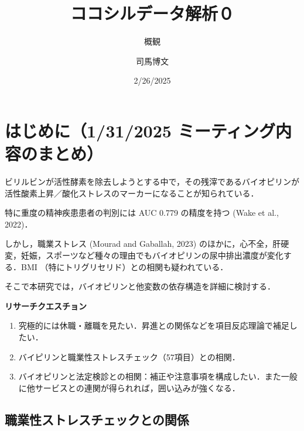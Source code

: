 \documentclass[
]{ltjsarticle}
\title{ココシルデータ解析０}
\subtitle{概観}
\author{司馬博文}
\date{2/26/2025}
\providecommand{\tightlist}{%
  \setlength{\itemsep}{0pt}\setlength{\parskip}{0pt}}\usepackage{longtable,booktabs,array}
\begin{document}
\maketitle


\section{はじめに（1/31/2025
ミーティング内容のまとめ）}\label{ux306fux3058ux3081ux306b1312025-ux30dfux30fcux30c6ux30a3ux30f3ux30b0ux5185ux5bb9ux306eux307eux3068ux3081}

ビリルビンが活性酵素を除去しようとする中で，その残滓であるバイオピリンが活性酸素上昇／酸化ストレスのマーカーになることが知られている．

特に重度の精神疾患患者の判別には AUC 0.779 の精度を持つ (Wake et al.,
2022)．

しかし，職業ストレス (Mourad and Gaballah, 2023)
のほかに，心不全，肝硬変，妊娠，スポーツなど種々の理由でもバイオピリンの尿中排出濃度が変化する．BMI
（特にトリグリセリド）との相関も疑われている．

そこで本研究では，バイオピリンと他変数の依存構造を詳細に検討する．

\begin{tcolorbox}[enhanced jigsaw, leftrule=.75mm, toprule=.15mm, bottomrule=.15mm, breakable, left=2mm, rightrule=.15mm, arc=.35mm, opacityback=0, colback=white, colframe=quarto-callout-tip-color-frame]

\vspace{-3mm}\textbf{リサーチクエスチョン}\vspace{3mm}

\begin{enumerate}
\def\labelenumi{\arabic{enumi}.}
\tightlist
\item
  {究極的には休職・離職を見たい}．昇進との関係などを項目反応理論で補足したい．
\item
  バイピリンと職業性ストレスチェック（57項目）との相関．
\item
  バイオピリンと法定検診との相関：補正や注意事項を構成したい．また一般に他サービスとの連関が得られれば，囲い込みが強くなる．
\end{enumerate}

\end{tcolorbox}

\label{slide-listing}

\subsection{職業性ストレスチェックとの関係}\label{ux8077ux696dux6027ux30b9ux30c8ux30ecux30b9ux30c1ux30a7ux30c3ux30afux3068ux306eux95a2ux4fc2}
\end{document}
